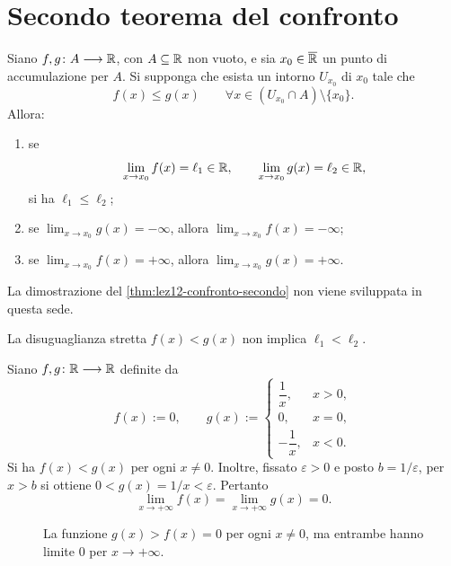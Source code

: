 \section{Secondo teorema del confronto}
\label{sec:lez12-confronto-secondo}

\begin{theorem}
\label{thm:lez12-confronto-secondo}
Siano \(f,g\colon A\longrightarrow\mathbb{R}\), con
\(A\subseteq\mathbb{R}\) non vuoto, e sia
\(x_0\in\overline{\mathbb{R}}\) un punto di accumulazione per \(A\).
Si supponga che esista un intorno \(U_{x_0}\) di
\(x_0\) tale che
\[
  f(x)\le g(x)
  \qquad\forall x\in(U_{x_0}\cap A)\setminus\{x_0\}.
\]
Allora:
\begin{enumerate}
  \item se
  \[
    \lim_{x\to x_0}f(x)=\ell_1\in\mathbb{R},
    \qquad
    \lim_{x\to x_0}g(x)=\ell_2\in\mathbb{R},
  \]
  si ha \(\ell_1\le\ell_2\);
  \item se \(\displaystyle\lim_{x\to x_0}g(x)=-\infty\),
  allora \(\displaystyle\lim_{x\to x_0}f(x)=-\infty\);
  \item se \(\displaystyle\lim_{x\to x_0}f(x)=+\infty\),
  allora \(\displaystyle\lim_{x\to x_0}g(x)=+\infty\).
\end{enumerate}
\end{theorem}

La dimostrazione del \cref{thm:lez12-confronto-secondo}
non viene sviluppata in questa sede.

La disuguaglianza stretta \(f(x)<g(x)\)
non implica \(\ell_1<\ell_2\).

\begin{example}
\label{ex:lez12-confronto-stretto-limiti-uguali}
Siano \(f,g\colon\mathbb{R}\longrightarrow\mathbb{R}\) definite da
\[
  f(x):=0,
  \qquad
  g(x):=
  \begin{cases}
    \dfrac1x, & x>0,\\[4pt]
    0, & x=0,\\[4pt]
    -\dfrac1x, & x<0.
  \end{cases}
\]
Si ha \(f(x)<g(x)\) per ogni \(x\ne0\). Inoltre,
fissato \(\varepsilon>0\) e posto \(b=1/\varepsilon\),
per \(x>b\) si ottiene \(0<g(x)=1/x<\varepsilon\).
Pertanto
\[
  \lim_{x\to+\infty}f(x)
  =\lim_{x\to+\infty}g(x)=0.
\]
\end{example}

\begin{figure}[htbp]
  \centering
  
  \caption{La funzione \(g(x)>f(x)=0\) per ogni
  \(x\ne0\), ma entrambe hanno limite \(0\) per
  \(x\to+\infty\).}
  \label{fig:lez12-stretto-limiti-uguali}
\end{figure}

